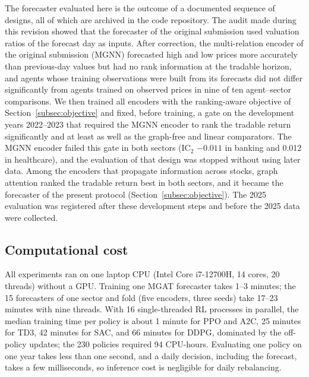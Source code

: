 {\color{blue}The forecaster evaluated here is the outcome of a documented sequence of designs, all of which are archived in the code repository. The audit made during this revision showed that the forecaster of the original submission used valuation ratios of the forecast day as inputs. After correction, the multi-relation encoder of the original submission (MGNN) forecasted high and low prices more accurately than previous-day values but had no rank information at the tradable horizon, and agents whose training observations were built from its forecasts did not differ significantly from agents trained on observed prices in nine of ten agent--sector comparisons. We then trained all encoders with the ranking-aware objective of Section~\ref{subsec:objective} and fixed, before training, a gate on the development years 2022--2023 that required the MGNN encoder to rank the tradable return significantly and at least as well as the graph-free and linear comparators. The MGNN encoder failed this gate in both sectors (IC$_2$ $-0.011$ in banking and 0.012 in healthcare), and the evaluation of that design was stopped without using later data. Among the encoders that propagate information across stocks, graph attention ranked the tradable return best in both sectors, and it became the forecaster of the present protocol (Section~\ref{subsec:objective}). The 2025 evaluation was registered after these development steps and before the 2025 data were collected.\par}

\subsection{Computational cost}\label{subsec:compute}

{\color{blue}All experiments ran on one laptop CPU (Intel Core i7-12700H, 14 cores, 20 threads) without a GPU. Training one MGAT forecaster takes 1--3 minutes; the 15 forecasters of one sector and fold (five encoders, three seeds) take 17--23 minutes with nine threads. With 16 single-threaded RL processes in parallel, the median training time per policy is about 1 minute for PPO and A2C, 25 minutes for TD3, 42 minutes for SAC, and 66 minutes for DDPG, dominated by the off-policy updates; the 230 policies required 94 CPU-hours. Evaluating one policy on one year takes less than one second, and a daily decision, including the forecast, takes a few milliseconds, so inference cost is negligible for daily rebalancing.\par}
